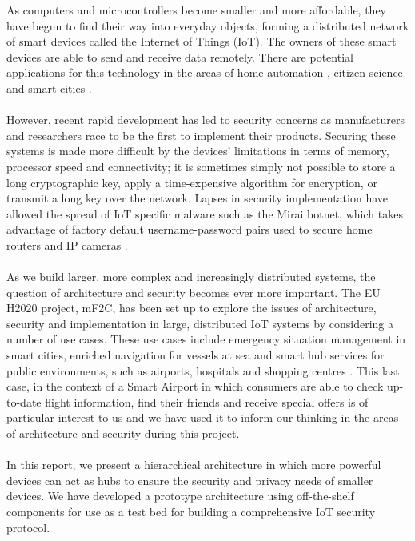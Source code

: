 As computers and microcontrollers become smaller and more affordable, they have begun to find their way into everyday objects, forming a distributed network of smart devices called the Internet of Things (IoT). The owners of these smart devices are able to send and receive data remotely. There are potential applications for this technology in the areas of home automation \cite{openhab}, citizen science \cite{radiation}\cite{flooddetection} and smart cities \cite{smartcities}.

\paragraph{}
However, recent rapid development has led to security concerns as manufacturers and researchers race to be the first to implement their products. Securing these systems is made more difficult by the devices’ limitations in terms of memory, processor speed and connectivity; it is sometimes simply not possible to store a long cryptographic key, apply a time-expensive algorithm for encryption, or transmit a long key over the network. Lapses in security implementation have allowed the spread of IoT specific malware such as the Mirai botnet, which takes advantage of factory default username-password pairs used to secure home routers and IP cameras \cite{mirai}.

\paragraph{}
As we build larger, more complex and increasingly distributed systems, the question of architecture and security becomes ever more important. The EU H2020 project, mF2C, has been set up to explore the issues of architecture, security and implementation in large, distributed IoT systems by considering a number of use cases. These use cases include emergency situation management in smart cities, enriched navigation for vessels at sea and smart hub services for public environments, such as airports, hospitals and shopping centres \cite{mf2cwebsite}. This last case, in the context of a Smart Airport in which consumers are able to check up-to-date flight information, find their friends and receive special offers is of particular interest to us and we have used it to inform our thinking in the areas of architecture and security during this project.

\paragraph{}
In this report, we present a hierarchical architecture in which more powerful devices can act as hubs to ensure the security and privacy needs of smaller devices.  We have developed a prototype architecture using off-the-shelf components for use as a test bed for building a comprehensive IoT security protocol.
